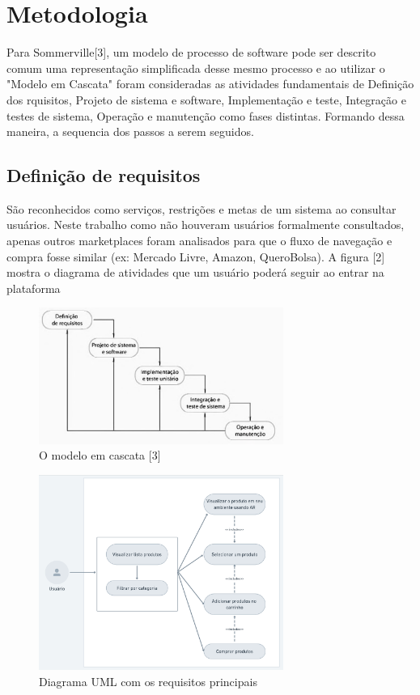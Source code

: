 \documentclass[conference]{IEEEtran}
\begin{document}
\section{Metodologia}
Para Sommerville[3], um modelo de processo de software pode ser descrito comum
uma representação simplificada desse mesmo processo e ao utilizar o "Modelo em
Cascata" foram consideradas as atividades fundamentais de Definição dos
rquisitos, Projeto de sistema e software, Implementação e teste, Integração e
testes de sistema, Operação e manutenção como fases distintas. Formando dessa
maneira, a sequencia dos passos a serem seguidos.

\subsection{Definição de requisitos}\label{AA}
São reconhecidos como serviços, restrições e metas de um sistema ao consultar
usuários. Neste trabalho como não houveram usuários formalmente consultados,
apenas outros marketplaces foram analisados para que o fluxo de navegação e
compra fosse similar (ex: Mercado Livre, Amazon, QueroBolsa). A figura [2]
mostra o diagrama de atividades que um usuário poderá seguir ao entrar na
plataforma

\begin{figure}[h]
  \caption{O modelo em cascata [3]}

  \centering %
  \includegraphics[width=8cm]{assets/modelo_cascata.png}
\end{figure}

\begin{figure}[h]
  \caption{Diagrama UML com os requisitos principais}

  \centering %
  \includegraphics[width=8cm]{assets/user_uml_diagram.png}
\end{figure}
\end{document}
